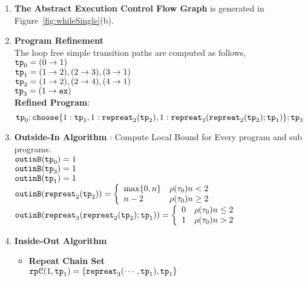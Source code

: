   \begin{enumerate}
    \item  \textbf{The Abstract Execution Control Flow Graph} is generated in Figure~\ref{fig:whileSingle}(b).
    \item \textbf{Program Refinement}
    \\
    The loop free simple transition paths are computed as follows,
     \\
    $\mathtt{tp}_0 = (0 \to 1)$
    \\
    $\mathtt{tp}_1 = (1 \to 2), (2 \to 3), (3 \to 1)$
    \\
    $\mathtt{tp}_2 = (1 \to 2), (2 \to 4), (4 \to 1)$
    \\
    $\mathtt{tp}_3 = (1 \to \mathtt{ex})$
    \\
    \textbf{Refined Program}:
    \[
      \tpath_0 ; 
      \rpchoose{
        1: \tpath_1, 
        1: \rprepeat_2(\tpath_2),
        1: \rprepeat_3(\rprepeat_2(\tpath_2); \tpath_1)}; \tpath_3
      \]
      \item \textbf{Outside-In Algorithm} : Compute Local Bound for Every program and sub programs.
      \\
    $\mathtt{outinB}(\mathtt{tp}_0) = 1$
    \\
    $\mathtt{outinB}(\mathtt{tp}_3) = 1$
    \\
    $\mathtt{outinB}(\mathtt{tp}_1) = 1 $
    \\
    $\outinB(\rprepeat_2(\tpath_2)) = 
    \left\{
      \begin{array}{ll}
      \max\{0, n\} & \env(\trace_0) n < 2 \\
      n - 2 & \env(\trace_0)  n \geq 2
      \end{array} 
    \right.$
    \\
    $\outinB(\rprepeat_3(\rprepeat_2(\tpath_2); \tpath_1)) = 
    \left\{
      \begin{array}{ll}
      0 & \env(\trace_0) n \leq 2 \\
      1 & \env(\trace_0)  n > 2
      \end{array} 
    \right.$
    \\
    \item \textbf{Inside-Out Algorithm}
    \begin{itemize}
      \item \textbf{Repeat Chain Set}
      \\
      $\mathtt{rp}\mathcal{C}(1, \mathtt{tp}_1) = \{\mathtt{repreat}_3(\cdots, \mathtt{tp}_1), \mathtt{tp}_1\}$ 

\end{itemize}
\end{enumerate}
